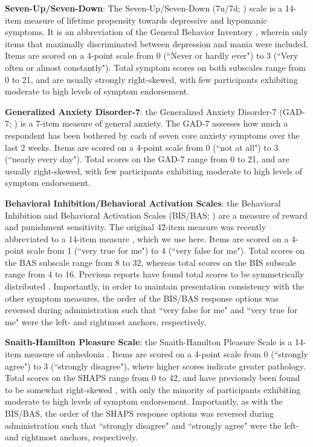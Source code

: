 \documentclass[a4paper,notitlepage,12pt]{article}
\begin{document}
\textbf{Seven-Up/Seven-Down}: The Seven-Up/Seven-Down (7u/7d; \cite{youngstrom_2013_susd}) scale is a 14-item measure of lifetime propensity towards depressive and hypomanic symptoms. It is an abbreviation of the General Behavior Inventory \cite{depue1981behavioral}, wherein only items that maximally discriminated between depression and mania were included. Items are scored on a 4-point scale from 0 (``Never or hardly ever") to 3 (``Very often or almost constantly"). Total symptom scores on both subscales range from 0 to 21, and are usually strongly right-skewed, with few participants exhibiting moderate to high levels of symptom endorsement. 

\textbf{Generalized Anxiety Disorder-7}: the Generalized Anxiety Disorder-7 (GAD-7; \cite{spitzer2006brief}) is a 7-item measure of general anxiety. The GAD-7 assesses how much a respondent has been bothered by each of seven core anxiety symptoms over the last 2 weeks. Items are scored on a 4-point scale from 0 (``not at all") to 3 (``nearly every day"). Total scores on the GAD-7 range from 0 to 21, and are usually right-skewed, with few participants exhibiting moderate to high levels of symptom endorsement.

\textbf{Behavioral Inhibition/Behavioral Activation Scales}: the Behavioral Inhibition and Behavioral Activation Scales (BIS/BAS; \cite{carver1994behavioral}) are a measure of reward and punishment sensitivity. The original 42-item measure was recently abbreviated to a 14-item measure \cite{pagliaccio2016revising}, which we use here. Items are scored on a 4-point scale from 1 (``very true for me") to 4 (``very false for me"). Total scores on the BAS subscale range from 8 to 32, whereas total scores on the BIS subscale range from 4 to 16. Previous reports have found total scores to be symmetrically distributed \cite{cooper2007behavioural}. Importantly, in order to maintain presentation consistency with the other symptom measures, the order of the BIS/BAS response options was reversed during administration such that ``very false for me" and ``very true for me" were the left- and rightmost anchors, respectively. 

\textbf{Snaith-Hamilton Pleasure Scale}: the Snaith-Hamilton Pleasure Scale is a 14-item measure of anhedonia \cite{snaith1995scale}. Items are scored on a 4-point scale from 0 (``strongly agree") to 3 (``strongly disagree"), where higher scores indicate greater pathology. Total scores on the SHAPS range from 0 to 42, and have previously been found to be somewhat right-skewed \cite{franken2007assessment, leventhal2015measuring}, with only the minority of participants exhibiting moderate to high levels of symptom endorsement. Importantly, as with the BIS/BAS, the order of the SHAPS response options was reversed during administration such that ``strongly disagree" and ``strongly agree" were the left- and rightmost anchors, respectively.
\end{document}
